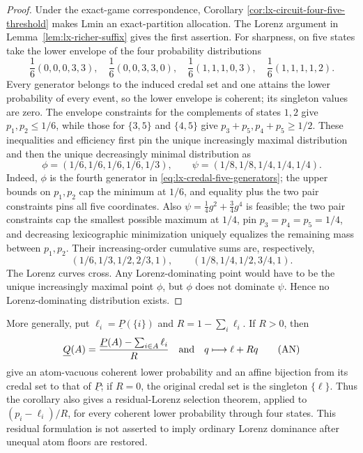 \begin{proof}
Under the exact-game correspondence, Corollary
\ref{cor:lx-circuit-four-five-threshold} makes Lmin an exact-partition
allocation.  The Lorenz argument in Lemma~\ref{lem:lx-richer-suffix} gives the
first assertion.  For sharpness, on five states take the lower envelope of
the four probability distributions
\[
 \frac1{6}(0,0,0,3,3),\quad
 \frac1{6}(0,0,3,3,0),\quad
 \frac1{6}(1,1,1,0,3),\quad
 \frac1{6}(1,1,1,1,2).
 \tag{CLP5}\label{eq:lx-credal-five-generators}
\]
Every generator belongs to the induced credal set and one attains the lower
probability of every event, so the lower envelope is coherent; its singleton
values are zero.  The envelope constraints for the complements of states
$1,2$ give $p_1,p_2\leq1/6$, while those for $\{3,5\}$ and $\{4,5\}$ give
$p_3+p_5,p_4+p_5\geq1/2$.  These inequalities and efficiency first pin the
unique increasingly maximal distribution and then the unique decreasingly
minimal distribution as
\[
 \phi=(1/6,1/6,1/6,1/6,1/3),\qquad
\psi=(1/8,1/8,1/4,1/4,1/4).
\]
Indeed, $\phi$ is the fourth generator in
\eqref{eq:lx-credal-five-generators}; the upper bounds on $p_1,p_2$ cap the
minimum at $1/6$, and equality plus the two pair constraints pins all five
coordinates.  Also
$\psi=\tfrac14g^2+\tfrac34g^4$ is feasible; the two pair constraints cap the
smallest possible maximum at $1/4$, pin $p_3=p_4=p_5=1/4$, and decreasing
lexicographic minimization uniquely equalizes the remaining mass between
$p_1,p_2$.
Their increasing-order cumulative sums are, respectively,
\[
 (1/6,1/3,1/2,2/3,1),\qquad
 (1/8,1/4,1/2,3/4,1).
\]
The Lorenz curves cross.  Any Lorenz-dominating point would have to be the
unique increasingly maximal point $\phi$, but $\phi$ does not dominate
$\psi$.  Hence no Lorenz-dominating distribution exists.
\end{proof}

More generally, put $\ell_i=\underline P(\{i\})$ and
$R=1-\sum_i\ell_i$.  If $R>0$, then
\[
 \underline Q(A)=
 \frac{\underline P(A)-\sum_{i\in A}\ell_i}{R}
 \quad\hbox{and}\quad q\longmapsto \ell+Rq
 \tag{AN}\label{eq:lx-credal-atom-normalization}
\]
give an atom-vacuous coherent lower probability and an affine bijection from
its credal set to that of $\underline P$; if $R=0$, the original credal set is
the singleton $\{\ell\}$.  Thus the corollary also gives a residual-Lorenz
selection theorem, applied to $(p_i-\ell_i)/R$, for every coherent lower
probability through four states.  This residual formulation is not asserted
to imply ordinary Lorenz dominance after unequal atom floors are restored.


